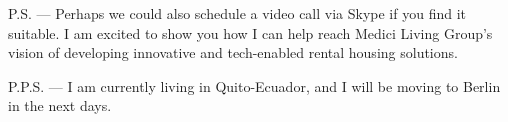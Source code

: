 \documentclass[11pt, a4paper]{awesome-cv}
\begin{document}
\makeletterclosing

P.S. — Perhaps we could also schedule a video call via Skype if you find it suitable. I am excited to show you how I can help reach Medici Living Group's vision of developing innovative and tech-enabled rental housing solutions.

P.P.S. —  I am currently living in Quito-Ecuador, and I will be moving to Berlin in the next days.
\end{document}
